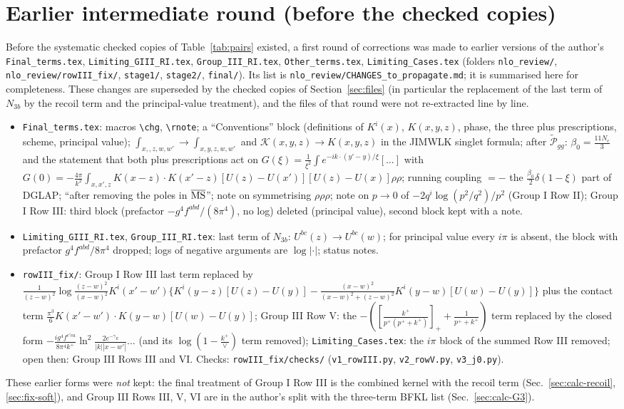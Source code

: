 \documentclass[10pt]{article}
\begin{document}
\section{Earlier intermediate round (before the checked copies)}\label{app:early}
\noindent Before the systematic checked copies of Table~\ref{tab:pairs} existed, a first round of corrections was made to earlier versions of the author's \texttt{Final\_terms.tex}, \texttt{Limiting\_GIII\_RI.tex}, \texttt{Group\_III\_RI.tex}, \texttt{Other\_terms.tex}, \texttt{Limiting\_Cases.tex} (folders \texttt{nlo\_review/}, \texttt{nlo\_review/rowIII\_fix/}, \texttt{stage1/}, \texttt{stage2/}, \texttt{final/}). Its list is \texttt{nlo\_review/CHANGES\_to\_propagate.md}; it is summarised here for completeness. These changes are superseded by the checked copies of Section~\ref{sec:files} (in particular the replacement of the last term of $N_{3b}$ by the recoil term and the principal-value treatment), and the files of that round were not re-extracted line by line.
\begin{itemize}
\item \texttt{Final\_terms.tex}: macros \texttt{\textbackslash chg}, \texttt{\textbackslash rnote}; a ``Conventions'' block (definitions of $K^{i}(x)$, $K(x,y,z)$, phase, the three plus prescriptions, scheme, principal value); $\int_{x,,z,w,w'}\to\int_{x,y,z,w,w'}$ and $\mathcal{K}(x,y,z)\to K(x,y,z)$ in the JIMWLK singlet formula; after $\widetilde{\mathcal P}_{gg}$: $\beta_{0}=\frac{11N_{c}}{3}$ and the statement that both plus prescriptions act on $G(\xi)=\frac{1}{\xi^{2}}\int e^{-ik\cdot(y'-y)/\xi}[\dots]$ with $G(0)=-\frac{4\pi}{k^{2}}\int_{x,x',z}K(x-z)\cdot K(x'-z)[U(z)-U(x')][U(z)-U(x)]\rho\rho$; running coupling $=-$ the $\frac{\beta_{0}}{2}\delta(1-\xi)$ part of DGLAP; ``after removing the poles in $\overline{\rm MS}$''; note on symmetrising $\rho\rho\rho$; note on $p\to0$ of $-2q^{i}\log(p^{2}/q^{2})/p^{2}$ (Group I Row II); Group I Row III: third block (prefactor $-g^{4}f^{abd}/(8\pi^{4})$, no log) deleted (principal value), second block kept with a note.
\item \texttt{Limiting\_GIII\_RI.tex}, \texttt{Group\_III\_RI.tex}: last term of $N_{3b}$: $U^{bc}(z)\to U^{bc}(w)$; for principal value every $i\pi$ is absent, the block with prefactor $g^{4}f^{abd}/8\pi^{4}$ dropped; logs of negative arguments are $\log|\cdot|$; status notes.
\item \texttt{rowIII\_fix/}: Group I Row III last term replaced by $\frac{1}{(z-w)^{2}}\log\frac{(z-w)^{2}}{(x-w)^{2}}K^{i}(x'-w')\{K^{i}(y-z)[U(z)-U(y)]-\frac{(x-w)^{2}}{(x-w)^{2}+(z-w)^{2}}K^{i}(y-w)[U(w)-U(y)]\}$ plus the contact term $\frac{\pi^{3}}{6}K(x'-w')\cdot K(y-w)[U(w)-U(y)]$; Group III Row V: the $-([\frac{k^{+}}{p^{+}(p^{+}+k^{+})}]_{+}+\frac{1}{p^{+}+k^{+}})$ term replaced by the closed form $-\frac{ig^{4}f^{c'ca}}{8\pi^{4}k^{+}}\ln^{2}\frac{2e^{-\gamma_{E}}}{|k||x-w'|}\dots$ (and its $\log(1-\frac{k^{+}}{\vee})$ term removed); \texttt{Limiting\_Cases.tex}: the $i\pi$ block of the summed Row III removed; open then: Group III Rows III and VI. Checks: \texttt{rowIII\_fix/checks/} (\texttt{v1\_rowIII.py}, \texttt{v2\_rowV.py}, \texttt{v3\_j0.py}).
\end{itemize}
\noindent These earlier forms were \emph{not} kept: the final treatment of Group I Row III is the combined kernel with the recoil term (Sec.~\ref{sec:calc-recoil}, \ref{sec:fix-soft}), and Group III Rows III, V, VI are in the author's split with the three-term BFKL list (Sec.~\ref{sec:calc-G3}).
\end{document}
